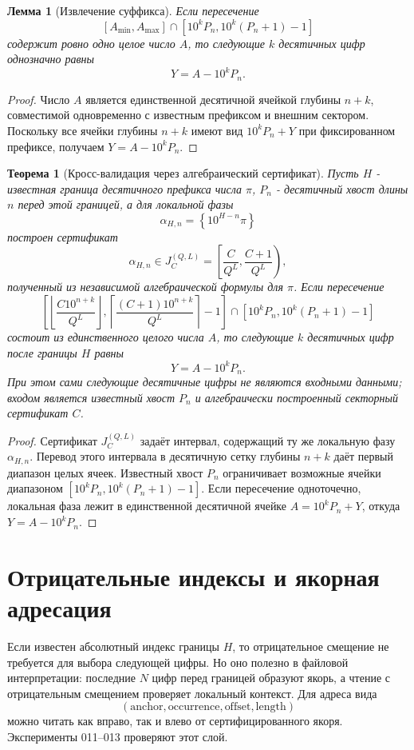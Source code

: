 \documentclass[11pt,a4paper]{article}
\newtheorem{theorem}{Теорема}
\newtheorem{lemma}{Лемма}
\newcommand{\fracpart}[1]{\left\{#1\right\}}
\newcommand{\floor}[1]{\left\lfloor #1 \right\rfloor}
\newcommand{\ceil}[1]{\left\lceil #1 \right\rceil}
\begin{document}
\begin{lemma}[Извлечение суффикса]
Если пересечение
\[
  [A_{\min},A_{\max}]
  \cap
  [10^kP_n,10^k(P_n+1)-1]
\]
содержит ровно одно целое число $A$, то следующие $k$ десятичных цифр однозначно равны
\[
  \boxed{Y=A-10^kP_n.}
\]
\end{lemma}

\begin{proof}
Число $A$ является единственной десятичной ячейкой глубины $n+k$, совместимой одновременно с известным префиксом и внешним сектором.  Поскольку все ячейки глубины $n+k$ имеют вид $10^kP_n+Y$ при фиксированном префиксе, получаем $Y=A-10^kP_n$.

\end{proof}

\begin{theorem}[Кросс-валидация через алгебраический сертификат]
Пусть $H$ - известная граница десятичного префикса числа $\pi$, $P_n$ - десятичный хвост длины $n$ перед этой границей, а для локальной фазы
\[
  \alpha_{H,n}=\fracpart{10^{H-n}\pi}
\]
построен сертификат
\[
  \alpha_{H,n}\in J_C^{(Q,L)}=\left[\frac{C}{Q^L},\frac{C+1}{Q^L}\right),
\]
полученный из независимой алгебраической формулы для $\pi$.  Если пересечение
\[
\left[
\floor{\frac{C10^{n+k}}{Q^L}},
\ceil{\frac{(C+1)10^{n+k}}{Q^L}}-1
\right]
\cap
[10^kP_n,10^k(P_n+1)-1]
\]
состоит из единственного целого числа $A$, то следующие $k$ десятичных цифр после границы $H$ равны
\[
  \boxed{Y=A-10^kP_n.}
\]
При этом сами следующие десятичные цифры не являются входными данными; входом является известный хвост $P_n$ и алгебраически построенный секторный сертификат $C$.
\end{theorem}

\begin{proof}
Сертификат $J_C^{(Q,L)}$ задаёт интервал, содержащий ту же локальную фазу $\alpha_{H,n}$.  Перевод этого интервала в десятичную сетку глубины $n+k$ даёт первый диапазон целых ячеек.  Известный хвост $P_n$ ограничивает возможные ячейки диапазоном $[10^kP_n,10^k(P_n+1)-1]$.  Если пересечение одноточечно, локальная фаза лежит в единственной десятичной ячейке $A=10^kP_n+Y$, откуда $Y=A-10^kP_n$.
\end{proof}

\section{Отрицательные индексы и якорная адресация}

Если известен абсолютный индекс границы $H$, то отрицательное смещение не требуется для выбора следующей цифры.  Но оно полезно в файловой интерпретации: последние $N$ цифр перед границей образуют якорь, а чтение с отрицательным смещением проверяет локальный контекст.  Для адреса вида
\[
  (\text{anchor},\text{occurrence},\text{offset},\text{length})
\]
можно читать как вправо, так и влево от сертифицированного якоря.  Эксперименты 011--013 проверяют этот слой.
\end{document}
